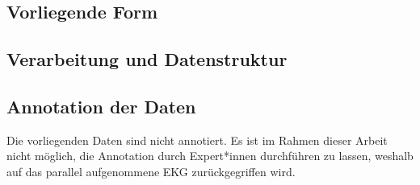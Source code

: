 	\subsection{Vorliegende Form}
	
	\subsection{Verarbeitung und Datenstruktur}

	\subsection{Annotation der Daten}

Die vorliegenden Daten sind nicht annotiert. Es ist im Rahmen dieser Arbeit nicht möglich, die Annotation durch Expert*innen durchführen zu lassen, weshalb auf das parallel aufgenommene \ac{EKG} zurückgegriffen wird.
